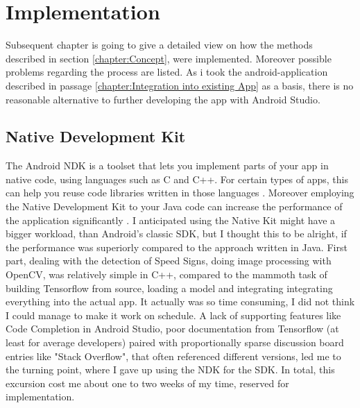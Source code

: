 
\chapter{Implementation}\label{chapter:Implementation}
Subsequent chapter is going to give a detailed view on how the methods described in section \ref{chapter:Concept}, were implemented. Moreover possible problems regarding the process are listed. 
As i took the android-application described in passage \ref{chapter:Integration into existing App} as a basis, there is no reasonable alternative to further developing the app with Android Studio.

\section{Native Development Kit}
 The Android NDK is a toolset that lets you implement parts of your app in native code, using languages such as C and C++. For certain types of apps, this can help you reuse code libraries written in those languages \cite{androidndk}. Moreover employing the Native Development Kit to your Java code can increase the performance of the application significantly  \cite{ndkspeed}. I anticipated using the Native Kit might have a bigger workload, than Android's classic SDK, but I thought this to be alright, if the performance was superiorly compared to the approach written in Java. \newline
 First part, dealing with the detection of Speed Signs, doing image processing with OpenCV,  was relatively simple in C++, compared to the mammoth task of building Tensorflow from source, loading a model and integrating integrating everything into the actual app. It actually was so time consuming, I did not think I could manage to make it work on schedule. A lack of supporting features like Code Completion in Android Studio, poor documentation from Tensorflow (at least for average developers) paired with proportionally sparse discussion board entries like "Stack Overflow", that often referenced different versions, led me to the turning point, where I gave up using the NDK for the SDK. In total, this excursion cost me about one to two weeks of my time, reserved for implementation.  
 

